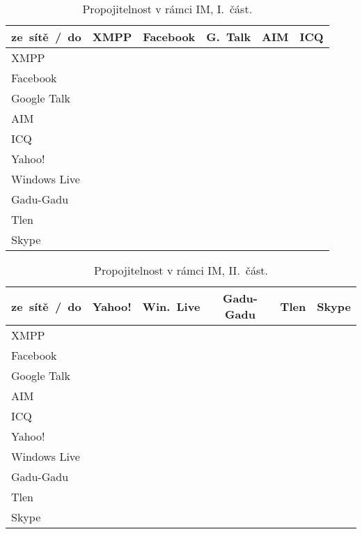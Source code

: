 \documentclass[12pt,oneside,final]{fithesis2}
\newcommand{\yes}{\scriptsize{\Checkmark}}
\newcommand{\no}{\scriptsize{\XSolidBrush}}
\begin{document}
\begin{table}[ht]
    \centering
    \begin{tabular}{ l | c c c c c }
        ze~sítě~/~do & XMPP & Facebook & G.~Talk & AIM & ICQ \\
        \hline
        XMPP         & \yes & \yes & \yes & \yes & \yes \\
        Facebook     & \no  & \yes & \no  & \no  & \no  \\
        Google Talk  & \yes & \yes & \yes & \yes & \yes \\
        AIM          & \no  & \yes & \yes & \yes & \yes \\
        ICQ          & \no  & \yes & \yes & \yes & \yes \\
        Yahoo!       & \no  & \no  & \no  & \no  & \no  \\
        Windows Live & \no  & \yes & \no  & \no  & \no  \\
        Gadu-Gadu    & \no  & \yes & \yes & \yes & \yes \\
        Tlen         & \no  & \no  & \no  & \no  & \no  \\
        Skype        & \no  & \yes & \no  & \no  & \no  \\
    \end{tabular}
    \caption{Propojitelnost v rámci IM, I.~část.}
    \label{imIntegration1}
\end{table}

\begin{table}[ht]
    \centering
    \begin{tabular}{ l | c c c c c }
        ze~sítě~/~do & Yahoo! & Win.~Live & Gadu-Gadu & Tlen & Skype \\
        \hline
        XMPP         & \yes & \yes & \yes & \yes & \yes  \\
        Facebook     & \no  & \no  & \no  & \no  & \no  \\
        Google Talk  & \yes & \yes & \yes & \yes & \no  \\
        AIM          & \no  & \no  & \no  & \no  & \no  \\
        ICQ          & \no  & \no  & \no  & \no  & \no  \\
        Yahoo!       & \yes & \yes & \no  & \no  & \no  \\
        Windows Live & \yes & \yes & \no  & \no  & \no  \\
        Gadu-Gadu    & \yes & \yes & \yes & \yes & \no  \\
        Tlen         & \no  & \no  & \yes & \yes & \no  \\
        Skype        & \no  & \no  & \no  & \no  & \yes \\
    \end{tabular}
    \caption{Propojitelnost v rámci IM, II.~část.}
    \label{imIntegration2}
\end{table}
\end{document}
